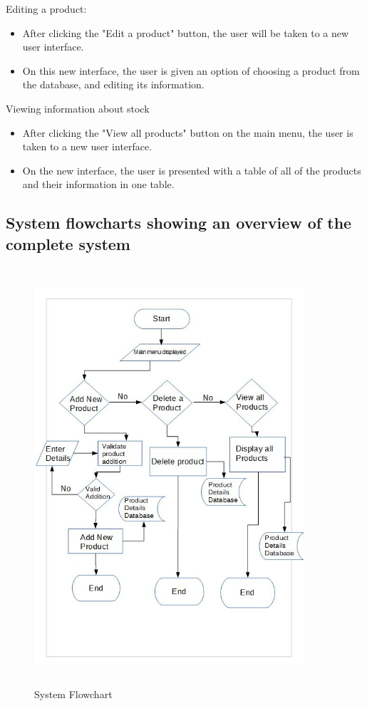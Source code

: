 Editing a product: 
\begin{itemize}
	\item After clicking the "Edit a product" button, the user will be taken to a new user interface.
	\item On this new interface, the user is given an option of choosing a product from the database, and editing its information.
\end{itemize}


Viewing information about stock
\begin{itemize}
	\item After clicking the "View all products" button on the main menu, the user is taken to a new user interface.
	\item On the new interface, the user is presented with a table of all of the products and their information in one table.
\end{itemize}
\subsection{System flowcharts showing an overview of the complete system}
\begin{figure}[H]
	\centering
	\includegraphics[width= 10cm, height = 15.5cm]{Design/images/design_flow_charts.JPG}
	\caption {System Flowchart} \label{fig:system_flow_chart}
\end{figure}
